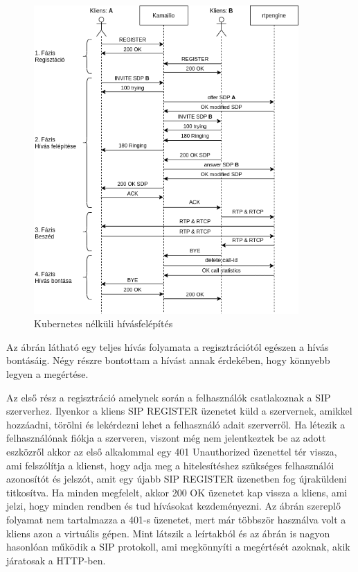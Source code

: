 \begin{figure}[!ht]
	\centering
	\includegraphics[width=0.9\textwidth, keepaspectratio]{figures/basic_call_flow.png}
	\caption{Kubernetes nélküli hívásfelépítés}
	\label{fig:HVSpaces}
\end{figure}

Az ábrán látható egy teljes hívás folyamata a regisztrációtól egészen a hívás bontásáig.
Négy részre bontottam a hívást annak érdekében, hogy könnyebb legyen a megértése.

Az első rész a regisztráció amelynek során a felhasználók csatlakoznak a SIP szerverhez.
Ilyenkor a kliens SIP REGISTER üzenetet küld a szervernek, amikkel hozzáadni, törölni és
lekérdezni lehet a felhasználó adait szerverről. Ha létezik a felhasználónak fiókja 
a szerveren, viszont még nem jelentkeztek be az adott eszközről akkor az első alkalommal 
egy 401 Unauthorized üzenettel tér vissza, ami felszólítja a klienst, hogy adja meg a 
hitelesítéshez szükséges felhasználói azonosítót és jelszót, amit egy újabb SIP REGISTER
üzenetben fog újraküldeni titkosítva. Ha minden megfelelt, akkor 200 OK üzenetet kap 
vissza a kliens, ami jelzi, hogy minden rendben és tud hívásokat kezdeményezni. Az ábrán
szereplő folyamat nem tartalmazza a 401-s üzenetet, mert már többször használva volt a 
kliens azon a virtuális gépen. Mint látszik a leírtakból és az ábrán is nagyon hasonlóan
működik a SIP protokoll, ami megkönnyíti a megértését azoknak, akik járatosak a HTTP-ben. 

